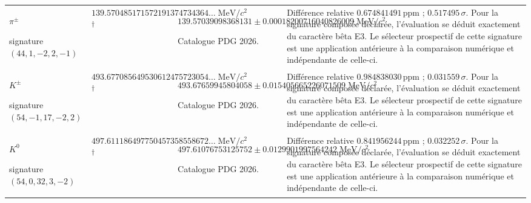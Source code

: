 \begin{longtable}{@{}>{\raggedright\arraybackslash}p{}>{\raggedright\arraybackslash}p{}>{\raggedright\arraybackslash}p{}>{\raggedright\arraybackslash}p{}@{}}
$\pi^\pm$\par signature $(44,\allowbreak 1,\allowbreak -2,\allowbreak 2,\allowbreak -1)$ & $139.570485\allowbreak{}171572\allowbreak{}191374\allowbreak{}734364\ldots\;\mathrm{MeV}/c^2$\textsuperscript{\(\dagger\)} & $139.570390\allowbreak{}983681\allowbreak{}31\pm 0.000182\allowbreak{}007160\allowbreak{}408260\allowbreak{}09\;\mathrm{MeV}/c^2$\par\footnotesize Catalogue PDG 2026. & Différence relative $0.674841\allowbreak{}491\,\mathrm{ppm}$ ; $0.517495\,\sigma$. Pour la signature composée déclarée, l’évaluation se déduit exactement du caractère bêta E3. Le sélecteur prospectif de cette signature est une application antérieure à la comparaison numérique et indépendante de celle-ci. \\
$K^\pm$\par signature $(54,\allowbreak -1,\allowbreak 17,\allowbreak -2,\allowbreak 2)$ & $493.677085\allowbreak{}649530\allowbreak{}612475\allowbreak{}723054\ldots\;\mathrm{MeV}/c^2$\textsuperscript{\(\dagger\)} & $493.676599\allowbreak{}458040\allowbreak{}58\pm 0.015405\allowbreak{}665226\allowbreak{}071509\;\mathrm{MeV}/c^2$\par\footnotesize Catalogue PDG 2026. & Différence relative $0.984838\allowbreak{}030\,\mathrm{ppm}$ ; $0.031559\,\sigma$. Pour la signature composée déclarée, l’évaluation se déduit exactement du caractère bêta E3. Le sélecteur prospectif de cette signature est une application antérieure à la comparaison numérique et indépendante de celle-ci. \\
$K^0$\par signature $(54,\allowbreak 0,\allowbreak 32,\allowbreak 3,\allowbreak -2)$ & $497.611186\allowbreak{}497750\allowbreak{}457358\allowbreak{}558672\ldots\;\mathrm{MeV}/c^2$\textsuperscript{\(\dagger\)} & $497.610767\allowbreak{}531257\allowbreak{}52\pm 0.012990\allowbreak{}199756\allowbreak{}4242\;\mathrm{MeV}/c^2$\par\footnotesize Catalogue PDG 2026. & Différence relative $0.841956\allowbreak{}244\,\mathrm{ppm}$ ; $0.032252\,\sigma$. Pour la signature composée déclarée, l’évaluation se déduit exactement du caractère bêta E3. Le sélecteur prospectif de cette signature est une application antérieure à la comparaison numérique et indépendante de celle-ci. \\

\end{longtable}
